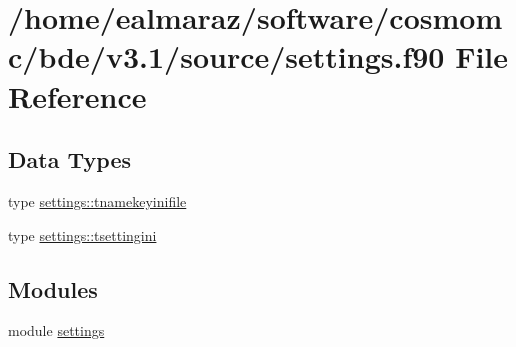 \hypertarget{settings_8f90}{}\section{/home/ealmaraz/software/cosmomc/bde/v3.1/source/settings.f90 File Reference}
\label{settings_8f90}
\subsection*{Data Types}
\begin{DoxyCompactItemize}
\item 
type \mbox{\hyperlink{structsettings_1_1tnamekeyinifile}{settings\+::tnamekeyinifile}}
\item 
type \mbox{\hyperlink{structsettings_1_1tsettingini}{settings\+::tsettingini}}
\end{DoxyCompactItemize}
\subsection*{Modules}
\begin{DoxyCompactItemize}
\item 
module \mbox{\hyperlink{namespacesettings}{settings}}
\end{DoxyCompactItemize}
